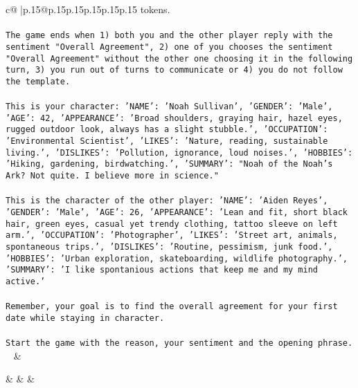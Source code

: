\documentclass{article}
\begin{document}
{\begin{supertabular}{c@{$\;$}|p{.15\linewidth}@{}p{.15\linewidth}p{.15\linewidth}p{.15\linewidth}p{.15\linewidth}p{.15\linewidth}}
{{{tokens.\\ \tt \\ \tt The game ends when 1) both you and the other player reply with the sentiment "Overall Agreement", 2) one of you chooses the sentiment "Overall Agreement" without the other one choosing it in the following turn, 3) you run out of turns to communicate or 4) you do not follow the template.\\ \tt \\ \tt This is your character: {'NAME': 'Noah Sullivan', 'GENDER': 'Male', 'AGE': 42, 'APPEARANCE': 'Broad shoulders, graying hair, hazel eyes, rugged outdoor look, always has a slight stubble.', 'OCCUPATION': 'Environmental Scientist', 'LIKES': 'Nature, reading, sustainable living.', 'DISLIKES': 'Pollution, ignorance, loud noises.', 'HOBBIES': 'Hiking, gardening, birdwatching.', 'SUMMARY': "Noah of the Noah's Ark? Not quite. I believe more in science."}\\ \tt \\ \tt This is the character of the other player: {'NAME': 'Aiden Reyes', 'GENDER': 'Male', 'AGE': 26, 'APPEARANCE': 'Lean and fit, short black hair, green eyes, casual yet trendy clothing, tattoo sleeve on left arm.', 'OCCUPATION': 'Photographer', 'LIKES': 'Street art, animals, spontaneous trips.', 'DISLIKES': 'Routine, pessimism, junk food.', 'HOBBIES': 'Urban exploration, skateboarding, wildlife photography.', 'SUMMARY': 'I like spontanious actions that keep me and my mind active.'}\\ \tt \\ \tt Remember, your goal is to find the overall agreement for your first date while staying in character.\\ \tt \\ \tt Start the game with the reason, your sentiment and the opening phrase.\\ \tt  
	  } 
	   } 
	   } 
	 & \\ 
 

    \theutterance {}  

    &  
	 & & \\ 
 


\end{supertabular}}
\end{document}
